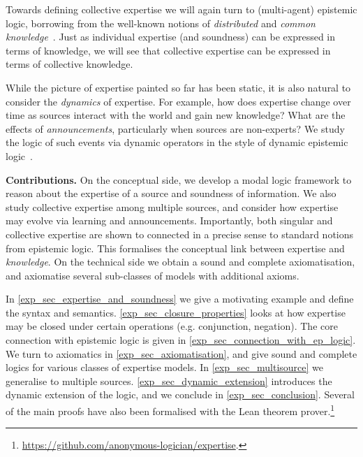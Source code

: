 Towards defining collective expertise we will again turn to (multi-agent)
epistemic logic, borrowing from the well-known notions of \emph{distributed}
and \emph{common knowledge}~\cite{fagin2003reasoning}. Just as individual
expertise (and soundness) can be expressed in terms of knowledge, we will see
that collective expertise can be expressed in terms of collective knowledge.

While the picture of expertise painted so far has been static, it is also
natural to consider the \emph{dynamics} of expertise. For example, how does
expertise change over time as sources interact with the world and gain new
knowledge? What are the effects of \emph{announcements}, particularly when
sources are non-experts? We study the logic of such events via dynamic
operators in the style of dynamic epistemic logic~\cite{van_Ditmarsch_2008}.

\textbf{Contributions.} On the conceptual side, we develop a modal logic
framework to reason about the expertise of a source and soundness of
information. We also study collective expertise among multiple sources, and
consider how expertise may evolve via learning and announcements. Importantly,
both singular and collective expertise are shown to connected in a precise
sense to standard notions from epistemic logic. This formalises the conceptual
link between expertise and \emph{knowledge}.
%
On the technical side we obtain a sound and complete axiomatisation, and
axiomatise several sub-classes of models with additional axioms.


\begin{chapteroutline}
    In \cref{exp_sec_expertise_and_soundness} we give a motivating example and
    define the syntax and semantics.  \cref{exp_sec_closure_properties} looks
    at how expertise may be closed under certain operations (e.g. conjunction,
    negation). The core connection with epistemic logic is given in
    \cref{exp_sec_connection_with_ep_logic}. We turn to axiomatics in
    \cref{exp_sec_axiomatisation}, and give sound and complete logics for
    various classes of expertise models. In \cref{exp_sec_multisource} we
    generalise to multiple sources. \cref{exp_sec_dynamic_extension} introduces
    the dynamic extension of the logic, and we conclude in
    \cref{exp_sec_conclusion}. Several of the main proofs have also been
    formalised with the Lean theorem
    prover.\footnote{\url{https://github.com/anonymous-logician/expertise}.
    }
\end{chapteroutline}

